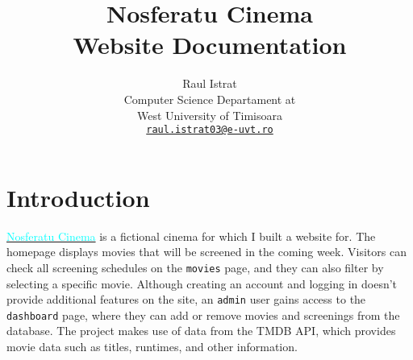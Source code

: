 \documentclass[a4paper]{article}
\title{Nosferatu Cinema\\Website Documentation}
\author{Raul Istrat\\
Computer Science Departament at\\
West University of Timisoara\\
\href{mailto:raul.istrat03@e-uvt.ro}{\texttt{raul.istrat03@e-uvt.ro}}}
\date{}
\begin{document}
\raggedright
\maketitle

\section*{Introduction}
    \href{https://github.com/domnu-raul/nosferatu-cinema/}{\textcolor{cyan}{Nosferatu Cinema}} is a fictional cinema for which I built a website for. The homepage displays movies that will be screened in the coming week. Visitors can check all screening schedules on the \texttt{movies} page, and they can also filter by selecting a specific movie. Although creating an account and logging in doesn't provide additional features on the site, an \texttt{admin} user gains access to the \texttt{dashboard} page, where they can add or remove movies and screenings from the database. The project makes use of data from the TMDB API, which provides movie data such as titles, runtimes, and other information.
\end{document}
